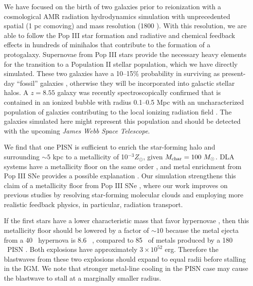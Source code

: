 \documentclass[12pt,preprint]{aastex}
\begin{document}
We have focused on the birth of two galaxies prior to reionization
with a cosmological AMR radiation hydrodynamics simulation with
unprecedented spatial (1 pc comoving) and mass resolution (1800 \Ms).
With this resolution, we are able to follow the Pop III star formation
and radiative and chemical feedback effects in hundreds of minihalos
that contribute to the formation of a protogalaxy.  Supernovae from
Pop III stars provide the necessary heavy elements for the transition
to a Population II stellar population, which we have directly
simulated.  These two galaxies have a 10--15\% probability in
surviving as present-day ``fossil'' galaxies \citep{Gnedin06},
otherwise they will be incorporated into galactic stellar halos.  A
$z=8.55$ galaxy was recently spectroscopically confirmed that is
contained in an ionized bubble with radius 0.1--0.5 Mpc with an
uncharacterized population of galaxies contributing to the local
ionizing radiation field \citep{Lehnert10_z8.6}.  The galaxies
simulated here might represent this population and should be detected
with the upcoming \textit{James Webb Space Telescope}.

We find that one PISN is sufficient to enrich the star-forming halo
and surrounding $\sim 5$ kpc to a metallicity of 10$^{-3} Z_\odot$,
given $M_{\rm char} = 100~\Ms$.  DLA systems have a metallicity floor
on the same order \citep{Wolfe05_Review, Penprase10}, and metal
enrichment from Pop III SNe provides a possible explanation
\citep{Kobayashi11}.  Our simulation strengthens this claim of a
metallicity floor from Pop III SNe \citep[see also][]{Tornatore07,
  Karlsson08, Maio11_Enrich}, where our work improves on previous
studies by resolving star-forming molecular clouds and employing more
realistic feedback physics, in particular, radiation transport.

If the first stars have a lower characteristic mass that favor
hypernovae \citep{Tumlinson07_IMF}, then this metallicity floor should
be lowered by a factor of $\sim 10$ because the metal ejecta from a 40
\Ms~hypernova is 8.6 \Ms~\citep{Nomoto06}, compared to 85 \Ms~of
metals produced by a 180 \Ms~PISN \citep{Heger02}.  Both explosions
have approximately $3 \times 10^{52}$ erg.  Therefore the blastwaves
from these two explosions should expand to equal radii before stalling
in the IGM.  We note that stronger metal-line cooling in the PISN case
may cause the blastwave to stall at a marginally smaller radius.  
\end{document}

